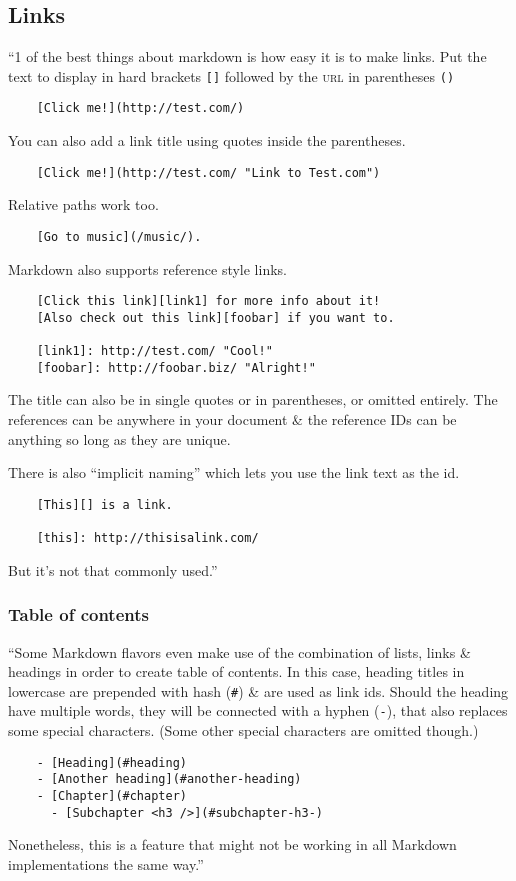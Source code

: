 \documentclass[oneside]{book}
\numberwithin{equation}{section}
\begin{document}
\subsection{Links}
``1 of the best things about markdown is how easy it is to make links. Put the text to display in hard brackets \texttt{[]} followed by the \textsc{url} in parentheses \texttt{()}
\begin{verbatim}
	[Click me!](http://test.com/)
\end{verbatim}
You can also add a link title using quotes inside the parentheses.
\begin{verbatim}
	[Click me!](http://test.com/ "Link to Test.com")
\end{verbatim}
Relative paths work too.
\begin{verbatim}
	[Go to music](/music/).
\end{verbatim}
Markdown also supports reference style links.
\begin{verbatim}
	[Click this link][link1] for more info about it!
	[Also check out this link][foobar] if you want to.
	
	[link1]: http://test.com/ "Cool!"
	[foobar]: http://foobar.biz/ "Alright!"
\end{verbatim}
The title can also be in single quotes or in parentheses, or omitted entirely. The references can be anywhere in your document \& the reference IDs can be anything so long as they are unique.

There is also ``implicit naming'' which lets you use the link text as the id.
\begin{verbatim}
	[This][] is a link.
	
	[this]: http://thisisalink.com/
\end{verbatim}
But it's not that commonly used.''

\subsubsection{Table of contents}
``Some Markdown flavors even make use of the combination of lists, links \& headings in order to create table of contents. In this case, heading titles in lowercase are prepended with hash (\verb|#|) \& are used as link ids. Should the heading have multiple words, they will be connected with a hyphen (\texttt{-}), that also replaces some special characters. (Some other special characters are omitted though.)
\begin{verbatim}
	- [Heading](#heading)
	- [Another heading](#another-heading)
	- [Chapter](#chapter)
	  - [Subchapter <h3 />](#subchapter-h3-)
\end{verbatim}
Nonetheless, this is a feature that might not be working in all Markdown implementations the same way.''
\end{document}
